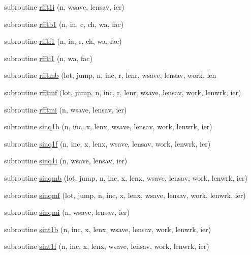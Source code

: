 \begin{DoxyCompactItemize}
\item 
subroutine \mbox{\hyperlink{namespacefftclass_abb3d8b6f0166090db98de3e7d627434f}{rfft1i}} (n, wsave, lensav, ier)
\item 
subroutine \mbox{\hyperlink{namespacefftclass_a338a7a4db13f2357c42a682142df3190}{rfftb1}} (n, in, c, ch, wa, fac)
\item 
subroutine \mbox{\hyperlink{namespacefftclass_af9f24f143ca02395c91f7757343e8003}{rfftf1}} (n, in, c, ch, wa, fac)
\item 
subroutine \mbox{\hyperlink{namespacefftclass_a122822a405cd96e5df936acaad731746}{rffti1}} (n, wa, fac)
\item 
subroutine \mbox{\hyperlink{namespacefftclass_acc4295c5a3646519e26c3dd5ae66418d}{rfftmb}} (lot, jump, n, inc, r, lenr, wsave, lensav, work, len
\item 
subroutine \mbox{\hyperlink{namespacefftclass_a4662111bc784aa321b0567a1a0578963}{rfftmf}} (lot, jump, n, inc, r, lenr, wsave, lensav, work, lenwrk, ier)
\item 
subroutine \mbox{\hyperlink{namespacefftclass_a6a543283f910322f94293d719f923881}{rfftmi}} (n, wsave, lensav, ier)
\item 
subroutine \mbox{\hyperlink{namespacefftclass_a6770a2a0c7bdf09af5ed719175fb4ca4}{sinq1b}} (n, inc, x, lenx, wsave, lensav, work, lenwrk, ier)
\item 
subroutine \mbox{\hyperlink{namespacefftclass_a205d9dc43dfb082cdee420a4ae2fb269}{sinq1f}} (n, inc, x, lenx, wsave, lensav, work, lenwrk, ier)
\item 
subroutine \mbox{\hyperlink{namespacefftclass_aa0d2ffdfc38a79ecd1b47de75f3d1084}{sinq1i}} (n, wsave, lensav, ier)
\item 
subroutine \mbox{\hyperlink{namespacefftclass_aa7e7e40b824e045f452a09a2e7abf333}{sinqmb}} (lot, jump, n, inc, x, lenx, wsave, lensav, work, lenwrk, ier)
\item 
subroutine \mbox{\hyperlink{namespacefftclass_ae56c7f24f27f2fb48f15359441b5e82f}{sinqmf}} (lot, jump, n, inc, x, lenx, wsave, lensav, work, lenwrk, ier)
\item 
subroutine \mbox{\hyperlink{namespacefftclass_a642a9e3f241f3aaa6baf58741d4cdd3b}{sinqmi}} (n, wsave, lensav, ier)
\item 
subroutine \mbox{\hyperlink{namespacefftclass_ada18e37204cdb55b83be98eaecc27730}{sint1b}} (n, inc, x, lenx, wsave, lensav, work, lenwrk, ier)
\item 
subroutine \mbox{\hyperlink{namespacefftclass_a6ae22ff215b2e962b410eb1b9c4860d7}{sint1f}} (n, inc, x, lenx, wsave, lensav, work, lenwrk, ier)

\end{DoxyCompactItemize}
